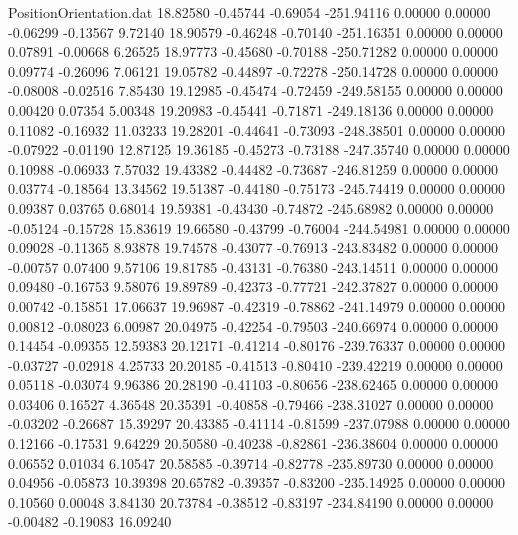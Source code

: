 \begin{filecontents}{PositionOrientation.dat}
  18.82580   -0.45744   -0.69054  -251.94116    0.00000    0.00000   -0.06299   -0.13567    9.72140
  18.90579   -0.46248   -0.70140  -251.16351    0.00000    0.00000    0.07891   -0.00668    6.26525
  18.97773   -0.45680   -0.70188  -250.71282    0.00000    0.00000    0.09774   -0.26096    7.06121
  19.05782   -0.44897   -0.72278  -250.14728    0.00000    0.00000   -0.08008   -0.02516    7.85430
  19.12985   -0.45474   -0.72459  -249.58155    0.00000    0.00000    0.00420    0.07354    5.00348
  19.20983   -0.45441   -0.71871  -249.18136    0.00000    0.00000    0.11082   -0.16932   11.03233
  19.28201   -0.44641   -0.73093  -248.38501    0.00000    0.00000   -0.07922   -0.01190   12.87125
  19.36185   -0.45273   -0.73188  -247.35740    0.00000    0.00000    0.10988   -0.06933    7.57032
  19.43382   -0.44482   -0.73687  -246.81259    0.00000    0.00000    0.03774   -0.18564   13.34562
  19.51387   -0.44180   -0.75173  -245.74419    0.00000    0.00000    0.09387    0.03765    0.68014
  19.59381   -0.43430   -0.74872  -245.68982    0.00000    0.00000   -0.05124   -0.15728   15.83619
  19.66580   -0.43799   -0.76004  -244.54981    0.00000    0.00000    0.09028   -0.11365    8.93878
  19.74578   -0.43077   -0.76913  -243.83482    0.00000    0.00000   -0.00757    0.07400    9.57106
  19.81785   -0.43131   -0.76380  -243.14511    0.00000    0.00000    0.09480   -0.16753    9.58076
  19.89789   -0.42373   -0.77721  -242.37827    0.00000    0.00000    0.00742   -0.15851   17.06637
  19.96987   -0.42319   -0.78862  -241.14979    0.00000    0.00000    0.00812   -0.08023    6.00987
  20.04975   -0.42254   -0.79503  -240.66974    0.00000    0.00000    0.14454   -0.09355   12.59383
  20.12171   -0.41214   -0.80176  -239.76337    0.00000    0.00000   -0.03727   -0.02918    4.25733
  20.20185   -0.41513   -0.80410  -239.42219    0.00000    0.00000    0.05118   -0.03074    9.96386
  20.28190   -0.41103   -0.80656  -238.62465    0.00000    0.00000    0.03406    0.16527    4.36548
  20.35391   -0.40858   -0.79466  -238.31027    0.00000    0.00000   -0.03202   -0.26687   15.39297
  20.43385   -0.41114   -0.81599  -237.07988    0.00000    0.00000    0.12166   -0.17531    9.64229
  20.50580   -0.40238   -0.82861  -236.38604    0.00000    0.00000    0.06552    0.01034    6.10547
  20.58585   -0.39714   -0.82778  -235.89730    0.00000    0.00000    0.04956   -0.05873   10.39398
  20.65782   -0.39357   -0.83200  -235.14925    0.00000    0.00000    0.10560    0.00048    3.84130
  20.73784   -0.38512   -0.83197  -234.84190    0.00000    0.00000   -0.00482   -0.19083   16.09240

\end{filecontents}
